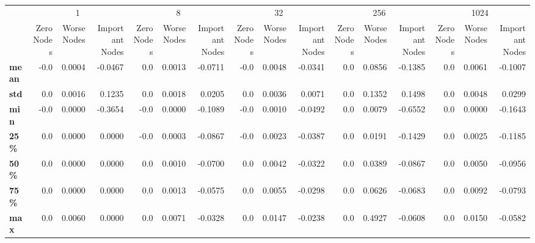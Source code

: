 \begin{tabular}{lrrrrrrrrrrrrrrr}
\toprule
{} & \multicolumn{3}{c}{1} & \multicolumn{3}{c}{8} & \multicolumn{3}{c}{32} & \multicolumn{3}{c}{256} & \multicolumn{3}{c}{1024} \\
{} & Zero Nodes & Worse Nodes & Important Nodes & Zero Nodes & Worse Nodes & Important Nodes & Zero Nodes & Worse Nodes & Important Nodes & Zero Nodes & Worse Nodes & Important Nodes & Zero Nodes & Worse Nodes & Important Nodes \\
\midrule
\textbf{mean} &       -0.0 &      0.0004 &         -0.0467 &        0.0 &      0.0013 &         -0.0711 &       -0.0 &      0.0048 &         -0.0341 &        0.0 &      0.0856 &         -0.1385 &        0.0 &      0.0061 &         -0.1007 \\
\textbf{std } &        0.0 &      0.0016 &          0.1235 &        0.0 &      0.0018 &          0.0205 &        0.0 &      0.0036 &          0.0071 &        0.0 &      0.1352 &          0.1498 &        0.0 &      0.0048 &          0.0299 \\
\textbf{min } &       -0.0 &      0.0000 &         -0.3654 &       -0.0 &      0.0000 &         -0.1089 &       -0.0 &      0.0010 &         -0.0492 &        0.0 &      0.0079 &         -0.6552 &        0.0 &      0.0000 &         -0.1643 \\
\textbf{25\% } &        0.0 &      0.0000 &          0.0000 &       -0.0 &      0.0003 &         -0.0867 &       -0.0 &      0.0023 &         -0.0387 &        0.0 &      0.0191 &         -0.1429 &        0.0 &      0.0025 &         -0.1185 \\
\textbf{50\% } &        0.0 &      0.0000 &          0.0000 &        0.0 &      0.0010 &         -0.0700 &        0.0 &      0.0042 &         -0.0322 &        0.0 &      0.0389 &         -0.0867 &        0.0 &      0.0050 &         -0.0956 \\
\textbf{75\% } &        0.0 &      0.0000 &          0.0000 &        0.0 &      0.0013 &         -0.0575 &        0.0 &      0.0055 &         -0.0298 &        0.0 &      0.0626 &         -0.0683 &        0.0 &      0.0092 &         -0.0793 \\
\textbf{max } &        0.0 &      0.0060 &          0.0000 &        0.0 &      0.0071 &         -0.0328 &        0.0 &      0.0147 &         -0.0238 &        0.0 &      0.4927 &         -0.0608 &        0.0 &      0.0150 &         -0.0582 \\
\bottomrule
\end{tabular}
